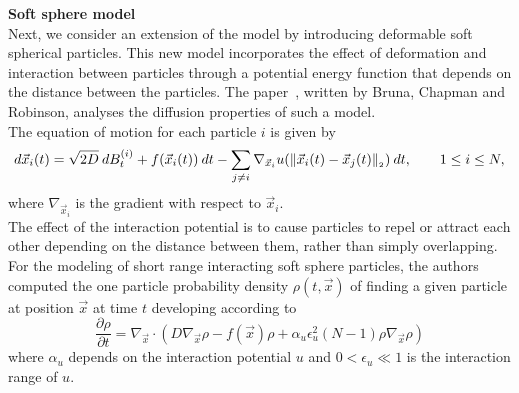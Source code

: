 \textbf{Soft sphere model} \\
Next, we consider an extension of the model by introducing deformable soft spherical particles. 
This new model incorporates the effect of deformation and interaction between particles through a potential energy function that depends on the distance between the particles.
The paper~\cite{Bruna2017}, written by Bruna, Chapman and Robinson, analyses the diffusion properties of such a model. \\
The equation of motion for each particle $i$ is given by
\begin{equation}
d\vec{x}_i(t) = \sqrt{2D} \: dB_t^{(i)} + f(\vec{x}_i(t))\: dt - \sum\limits_{j\neq i} \nabla_{\vec{x}_i} u (\norm[ \vec{x}_i(t) - \vec{x}_j(t)]) \: dt, \qquad 1 \leq i \leq N,
\end{equation}
where $\nabla_{\vec{x}_i}$ is the gradient with respect to $\vec{x}_i$. \\
The effect of the interaction potential is to cause particles to repel or attract each other depending on the distance between them, rather than simply overlapping. \\
For the modeling of short range interacting soft sphere particles, the authors computed the one particle probability density $\rho(t, \vec{x})$ of finding a given particle at position $\vec{x}$ at time $t$ developing according to
\begin{equation}
\dfrac{\partial \rho}{\partial t} = \nabla_{\vec{x}} \cdot (D \nabla_{\vec{x}} \rho - f(\vec{x}) \rho + \alpha_u \epsilon_u^2(N-1)\rho \nabla_{\vec{x}} \rho)
\end{equation}
where $\alpha_u$ depends on the interaction potential $u$ and $0 < \epsilon_u \ll 1$ is the interaction range of $u$.


